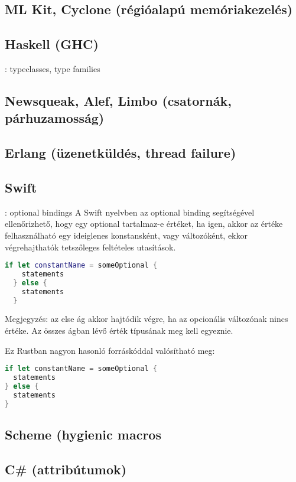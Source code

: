 \subsection{ML Kit, Cyclone (régióalapú memóriakezelés)}

\subsection{Haskell (GHC)}: typeclasses, type families

\subsection{Newsqueak, Alef, Limbo (csatornák, párhuzamosság)}

\subsection{Erlang (üzenetküldés, thread failure)}

\subsection{Swift}: optional bindings
A Swift nyelvben az optional binding segítségével ellenőrizhető, hogy egy optional tartalmaz-e értéket, ha igen, akkor az értéke felhasználható egy ideiglenes konstansként, vagy változóként, ekkor végrehajthatók tetszőleges feltételes utasítások. %
\begin{lstlisting}[language=Swift]
  if let constantName = someOptional {
    statements
  } else {
    statements
  }
\end{lstlisting}
Megjegyzés: az else ág akkor hajtódik végre, ha az opcionális változónak nincs értéke. Az összes ágban lévő érték típusának meg kell egyeznie.

Ez Rustban nagyon hasonló forráskóddal valósítható meg:
\begin{lstlisting}[language=Rust, style=boxed, style=colouredRust]
if let constantName = someOptional {
  statements
} else {
  statements
}
\end{lstlisting}

\subsection{Scheme (hygienic macros}

\subsection{C\# (attribútumok)}

